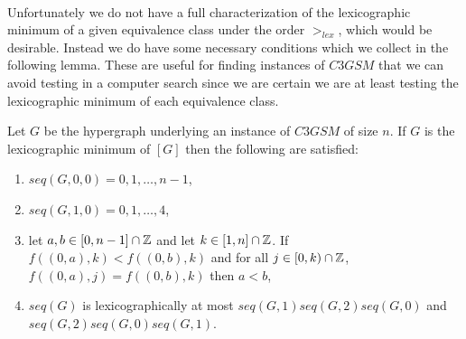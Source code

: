 \paragraph{}
Unfortunately we do not have a full characterization of the lexicographic minimum of a given equivalence class under the order $>_{lex}$, which would be desirable. Instead we do have some necessary conditions which we collect in the following lemma. These are useful for finding instances of $C3GSM$ that we can avoid testing in a computer search since we are certain we are at least testing the lexicographic minimum of each equivalence class.
\begin{lemma}\label{lemma:nec-symmetry}
Let $G$ be the hypergraph underlying an instance of $C3GSM$ of size $n$. If $G$ is the lexicographic minimum of $[G]$ then the following are satisfied:
\begin{enumerate}
\item $seq(G,0,0) = 0,1,\dots,n-1$,
\item $seq(G,1,0) = 0,1,\dots,4$,
\item let $a, b \in [0,n-1] \cap \mathbb{Z}$ and let $k \in [1,n] \cap \mathbb{Z}$. If $f((0,a), k) < f((0,b), k)$ and for all $j \in [0,k) \cap \mathbb{Z}$, $f((0,a),j) =f((0,b),k)$ then $a < b$,
\item $seq(G)$ is lexicographically at most $seq(G,1)seq(G,2)seq(G,0)$ and $seq(G,2)seq(G,0)seq(G,1)$.
\end{enumerate}
\end{lemma}
